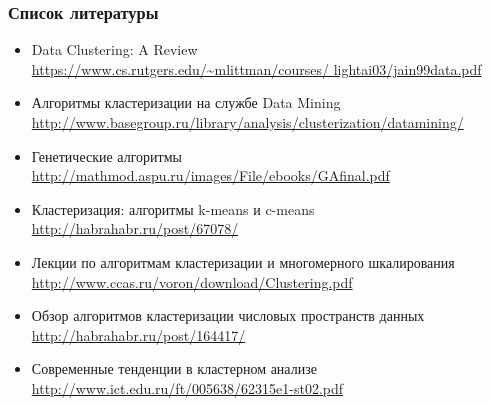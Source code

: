 \begin{frame} %
    \frametitle{Список литературы}
    \begin{itemize}
      \item\normalsize Data Clustering: A Review\\
        \tiny\url{https://www.cs.rutgers.edu/~mlittman/courses/
          lightai03/jain99data.pdf}
        \item\normalsize Алгоритмы кластеризации на службе Data Mining\\
          \tiny\url{http://www.basegroup.ru/library/analysis/clusterization/datamining/}
        \item\normalsize Генетические алгоритмы\\
            \tiny\url{http://mathmod.aspu.ru/images/File/ebooks/GAfinal.pdf}
        \item\normalsize Кластеризация: алгоритмы k-means и c-means\\
          \tiny\url{http://habrahabr.ru/post/67078/}
        \item\normalsize Лекции по алгоритмам кластеризации и многомерного
          шкалирования\\
          \tiny\url{http://www.ccas.ru/voron/download/Clustering.pdf}
        \item\normalsize Обзор алгоритмов кластеризации числовых пространств
          данных\\
          \tiny\url{http://habrahabr.ru/post/164417/}
        \item\normalsize Современные тенденции в кластерном анализе\\
          \tiny\url{http://www.ict.edu.ru/ft/005638/62315e1-st02.pdf}
    \end{itemize}
\end{frame}

